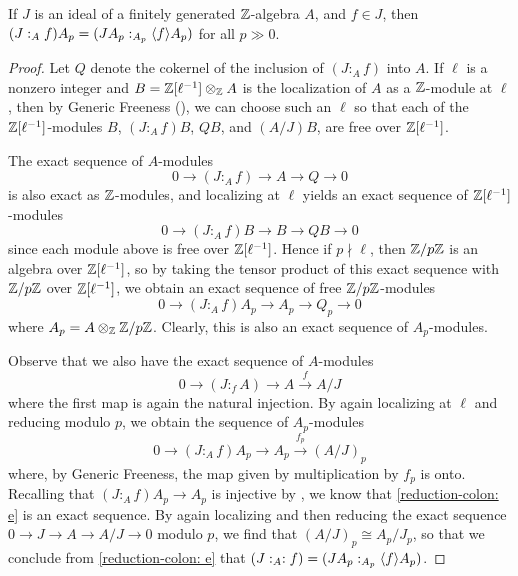 \documentclass[11pt]{amsart}
\begin{document}
\begin{lemma}
\label{colon mod p: L}
 If $J$ is an ideal of a finitely generated $\mathbb{Z}$-algebra $A$, and $f \in J$, then 
 $(J:_A f)A _p = (JA_p :_{A_p} \langle f \rangle A_p)$ for all $p \gg 0$.
 \end{lemma}

\begin{proof}
Let $Q$ denote the cokernel of the inclusion of $(J:_A f)$ into $A$.  If $\ell$ is a nonzero integer and $B = \mathbb{Z}[\ell^{-1}] \otimes_{\mathbb{Z}} A$ is the localization of $A$ as a $\mathbb{Z}$-module at $\ell$, then by Generic Freeness (), we can choose such an $\ell$ so that each of the $\mathbb{Z}[\ell^{-1}]$-modules  $B$, $(J:_A f)B$, $QB$, and $(A/J)B$, are free over $\mathbb{Z}[\ell^{-1}]$.

The exact sequence of $A$-modules
 \[
  0 \longrightarrow (J:_A f) \longrightarrow A \longrightarrow Q \to 0
 \]
 is also exact as $\mathbb{Z}$-modules, and localizing at $\ell$ yields an exact sequence of $\mathbb{Z}[\ell^{-1}]$-modules
 \[ 0  \longrightarrow (J:_A f)B \longrightarrow B \longrightarrow QB \longrightarrow 0 \]
since each module above is free over $\mathbb{Z}[\ell^{-1}]$.
Hence if $p \nmid \ell$, then $\mathbb{Z}/p\mathbb{Z}$ is an algebra over $\mathbb{Z}[\ell^{-1}]$, so by taking the tensor product of this exact sequence with $\mathbb{Z}/p\mathbb{Z}$ over $\mathbb{Z}[\ell^{-1}]$, we obtain an exact sequence of free $\mathbb{Z}/p\mathbb{Z}$-modules
\begin{equation} \label{colon-injection: e} 0  \longrightarrow (J:_A f)A_p \longrightarrow A_p \to Q_p \longrightarrow 0 \end{equation} where $A_p = A \otimes_{\mathbb{Z}} \mathbb{Z}/p\mathbb{Z}$.  Clearly, this is also an exact sequence of $A_p$-modules.

Observe that we also have the exact sequence of $A$-modules 
\[ 0 \longrightarrow (J:_f A) \longrightarrow A \stackrel{f}{\longrightarrow} A/J 
\]
where the first map is again the natural injection.  
By again localizing at $\ell$ and reducing modulo $p$, we obtain the sequence of $A_p$-modules 
\begin{equation} \label{reduction-colon: e}
0 \longrightarrow (J:_A f)A_p \longrightarrow A_p \stackrel{f_p}{\longrightarrow} \left( A/J \right)_p 
\end{equation}
where, by Generic Freeness, the map given by multiplication by $f_p$ is onto.  Recalling that $(J:_A f)A_p \longrightarrow A_p$ is injective by , we know that \eqref{reduction-colon: e} is an exact sequence.  
By again localizing and then reducing the exact sequence  
$0 \to J \to A \to A/J\to 0$ modulo $p$, we find that $\left(A/J\right)_p \cong A_p/J_p$, so that we conclude from \eqref{reduction-colon: e} that $(J:_A: f) = (J A_p :_{A_p} \langle f \rangle A_p)$. 
\end{proof}
\end{document}
